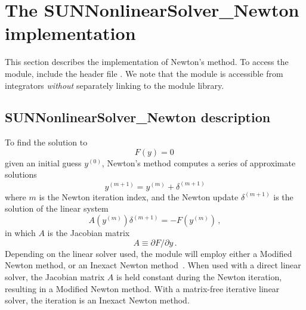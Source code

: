 \section{The SUNNonlinearSolver\_Newton implementation}
\label{s:sunnonlinsol_newton}

This section describes the {\sunnonlinsol} implementation of Newton's method. To
access the {\sunnonlinsolnewton} module, include the header file
. We note that the {\sunnonlinsolnewton}
module is accessible from {\sundials} integrators \textit{without} separately
linking to the  module library.

\subsection{SUNNonlinearSolver\_Newton description}
\label{ss:sunnonlinsolnewton_math}

To find the solution to
\begin{equation}\label{e:newton_sys}
  F(y) = 0 \,
\end{equation}
given an initial guess $y^{(0)}$, Newton's method computes a series of
approximate solutions
\begin{equation}
  y^{(m+1)} = y^{(m)} + \delta^{(m+1)}
\end{equation}
where $m$ is the Newton iteration index, and the Newton update $\delta^{(m+1)}$
is the solution of the linear system
\begin{equation}\label{e:newton_linsys}
  A(y^{(m)}) \delta^{(m+1)} = -F(y^{(m)}) \, ,
\end{equation}
in which $A$ is the Jacobian matrix
\begin{equation}\label{e:newton_mat}
  A \equiv \partial F / \partial y \, .
\end{equation}
Depending on the linear solver used, the {\sunnonlinsolnewton} module
will employ either a Modified Newton method, or an Inexact Newton
method~\cite{Bro:87,BrSa:90,DES:82,DeSc:96,Kel:95}. When used with a direct
linear solver, the Jacobian matrix $A$ is held constant during the Newton
iteration, resulting in a Modified Newton method. With a matrix-free iterative
linear solver, the iteration is an Inexact Newton method.

